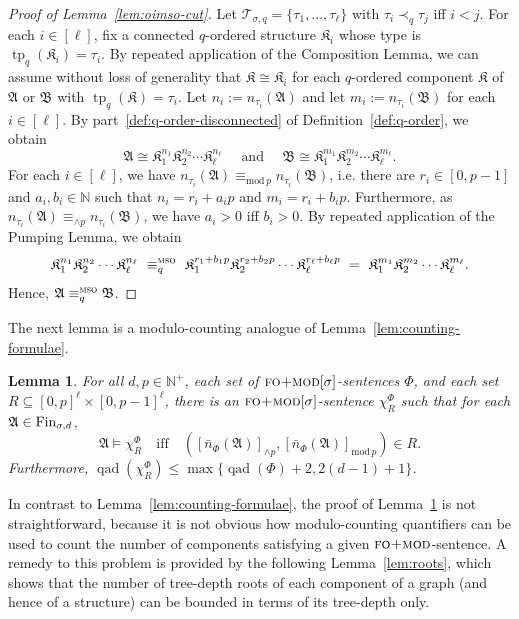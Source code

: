 \documentclass[11pt]{article}
\newtheorem{lemma}[theorem]{Lemma}
\newcommand{\fin}{\textup{Fin}}
\newcommand{\logic}[1]{\textsc{#1}}
\newcommand{\FOmod}{\logic{fo+mod}}
\newcommand{\MSO}{\logic{mso}}
\newcommand{\eleq}[1][]{\equiv_{#1}}
\newcommand{\msoeleq}[1][]{\eleq[#1]^{\MSO{}}}
\newcommand{\types}[1][\sigma,q,d]{\mathcal{T}_{#1}}
\newcommand{\maxeq}[1]{\equiv_{{\wedge}#1}}
\newcommand{\redmax}[2]{[#1]_{{\wedge}#2}}
\newcommand{\modeq}[1]{\equiv_{\mathrm{mod}\,#1}}
\newcommand{\redmod}[2]{[#1]_{\mathrm{mod}\,#2}}
\newcommand{\qad}[1]{\operatorname{qad}(#1)}
\DeclareMathOperator{\tp}{tp}
\newcommand{\struct}[1]{\mathfrak{#1}}
\newcommand{\AS}{\struct{A}}
\newcommand{\BS}{\struct{B}}
\newcommand{\KS}{\struct{K}}
\newcommand{\iso}{\cong}
\newcommand{\set}[1]{\{#1\}}
\newcommand{\N}{\mathbb{N}}
\newcommand{\Npos}{\mathbb{N}^{+}}
\begin{document}
\begin{proof}[Proof of Lemma~\ref{lem:oimso-cut}]
  Let $\types[\sigma,q] = \set{\tau_{1}, \ldots, \tau_{\ell}}$ with
  $\tau_{i} \prec_{q} \tau_{j}$ iff $i < j$.  For each $i\in [\ell]$,
  fix a connected $q$-ordered structure $\KS_{i}$ whose type is
  $\tp_{q}(\KS_{i}) = \tau_{i}$.  By repeated application of the
  Composition Lemma, we can assume without loss of generality that
  $\KS\iso \KS_{i}$ for each $q$-ordered component $\KS$ of $\AS$ or
  $\BS$ with $\tp_{q}(\KS)=\tau_{i}$.  Let $n_{i}:=n_{\tau_{i}}(\AS)$
  and let $m_{i}:=n_{\tau_{i}}(\BS)$ for each $i\in [\ell]$. By
  part~\ref{def:q-order-disconnected} of Definition~\ref{def:q-order},
  we obtain
  \[
  \AS \iso \KS_{1}^{n_{1}} \KS_{2}^{n_{2}} \dotsb
  \KS_{\ell}^{n_{\ell}} 
  \quad \text{ and } \quad
  \BS \iso
  \KS_{1}^{m_{1}} \KS_{2}^{m_{2}} \dotsb \KS_{\ell}^{m_{\ell}}.
  \]
  For each $i\in [\ell]$, we have $n_{\tau_i}(\AS) \modeq{p}
  n_{\tau_i}(\BS)$, i.e. there are $r_{i}\in [0,p-1]$ and
  $a_{i}, b_{i}\in \N$ such that $n_{i}=r_{i}+a_{i}p$ and
  $m_{i}=r_{i}+b_{i}p$. Furthermore, as
  $n_{\tau_i}(\AS) \maxeq{p} n_{\tau_i}(\BS)$, we have $a_{i}>0$ iff
  $b_{i}>0$.  By repeated application of the Pumping Lemma, we obtain
  \[ \KS_{1}^{n_{1}} \KS_{2}^{n_{2}} \dotsb \KS_{\ell}^{n_{\ell}} \
  \msoeleq[q] \ \KS_{1}^{r_{1}+b_1p} \KS_{2}^{r_{2}+b_2p} \dotsb \KS_{\ell}^{r_{\ell}+b_\ell p}
  \ = \ \KS_{1}^{m_{1}} \KS_{2}^{m_{2}} \dotsb
  \KS_{\ell}^{m_{\ell}}. \] Hence, $\AS \msoeleq[q] \BS$.
\end{proof}

The next lemma is a modulo-counting analogue of
Lemma~\ref{lem:counting-formulae}.

\begin{lemma}
  \label{lem:mod-counting-formulae}
  For all $d,p\in \Npos$, each set of $\FOmod[\sigma]$-sentences
  $\Phi$, and each
  set $R \subseteq [0,p]^\ell \times [0,p-1]^\ell$, there is an
  $\FOmod[\sigma]$-sentence $\chi^{\Phi}_{R}$ such that for each $\AS\in \fin_{\sigma,d}$,
  \[
  \AS \models \chi^\Phi_R
  \quad\text{iff}\quad
  \left(
    \redmax{\bar{n}_{\Phi}(\AS)}{p},
    \redmod{\bar{n}_{\Phi}(\AS)}{p}
  \right) \in R.
  \]
  Furthermore,
  $
  \qad{\chi^\Phi_R}\leq \max\set{\qad{\Phi}+2, 2(d-1)+1}
  $.
\end{lemma}

In contrast to Lemma~\ref{lem:counting-formulae}, the proof of
Lemma~\ref{lem:mod-counting-formulae} is not straightforward, because it is not
obvious how modulo-counting quantifiers can be used to count the number of
components satisfying a given $\FOmod{}$-sentence.  A remedy to this problem is
provided by the following Lemma~\ref{lem:roots}, which shows that the number of
tree-depth roots of each component of a graph (and hence of a structure) can be
bounded in terms of its tree-depth only.
\end{document}
